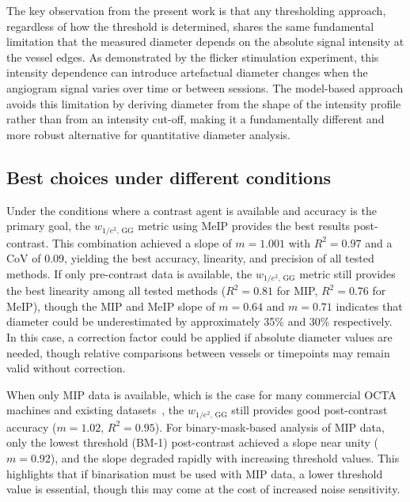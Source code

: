 The key observation from the present work is that any thresholding approach, regardless of how the threshold is determined, shares the same fundamental limitation that the measured diameter depends on the absolute signal intensity at the vessel edges. As demonstrated by the flicker stimulation experiment, this intensity dependence can introduce artefactual diameter changes when the angiogram signal varies over time or between sessions. The model-based approach avoids this limitation by deriving diameter from the shape of the intensity profile rather than from an intensity cut-off, making it a fundamentally different and more robust alternative for quantitative diameter analysis.

\subsection{Best choices under different conditions}
\label{subsec:best_choices}
Under the conditions where a contrast agent is available and accuracy is the primary goal, the $w_{1/e^2,\,\mathrm{GG}}$ metric using MeIP provides the best results post-contrast. This combination achieved a slope of $m = 1.001$ with $R^2 = 0.97$ and a CoV of 0.09, yielding the best accuracy, linearity, and precision of all tested methods. If only pre-contrast data is available, the $w_{1/e^2,\,\mathrm{GG}}$ metric still provides the best linearity among all tested methods ($R^2 = 0.81$ for MIP, $R^2 = 0.76$ for MeIP), though the MIP and MeIP slope of $m = 0.64$ and $m = 0.71$ indicates that diameter could be underestimated by approximately 35\% and 30\% respectively. In this case, a correction factor could be applied if absolute diameter values are needed, though relative comparisons between vessels or timepoints may remain valid without correction.

When only MIP data is available, which is the case for many commercial OCTA machines and existing datasets~\cite{sampsonTowardsStandardizingRetinal2022,untrachtTowardsStandardisingRetinal2024}, the $w_{1/e^2,\,\mathrm{GG}}$ still provides good post-contrast accuracy ($m = 1.02$, $R^2 = 0.95$). For binary-mask-based analysis of MIP data, only the lowest threshold (BM-1) post-contrast achieved a slope near unity ($m = 0.92$), and the slope degraded rapidly with increasing threshold values. This highlights that if binarisation must be used with MIP data, a lower threshold value is essential, though this may come at the cost of increased noise sensitivity.

